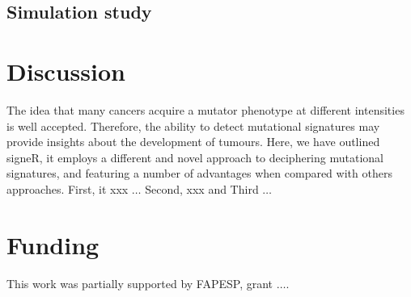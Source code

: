 \documentclass{bioinfo}
\begin{document}
\subsection{Simulation study}

\section{Discussion}
The idea that many cancers acquire a mutator phenotype at different 
intensities is well accepted. Therefore, the ability to detect 
mutational signatures may provide insights about the development of
tumours. Here, we have outlined signeR, it employs a different and 
novel approach to deciphering mutational signatures, and featuring a
number of advantages when compared with others approaches. First, it
xxx $\ldots$ Second, xxx and Third $\ldots$ 

\section*{Funding}
This work was partially supported by FAPESP, grant $\ldots$. 
\vspace*{-12pt}
 
 

\end{document}
